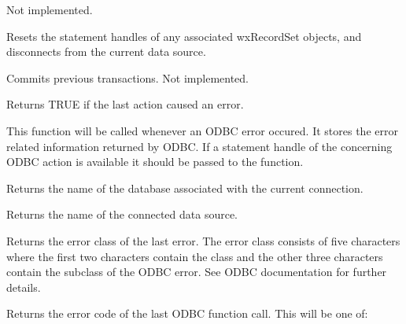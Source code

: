 
Not implemented.



Resets the statement handles of any associated wxRecordSet objects,
and disconnects from the current data source.



Commits previous transactions. Not implemented.



Returns TRUE if the last action caused an error.



This function will be called whenever an ODBC error occured. It stores the
error related information returned by ODBC. If a statement handle of the
concerning ODBC action is available it should be passed to the function.



Returns the name of the database associated with the current connection.



Returns the name of the connected data source.



Returns the error class of the last error. The error class consists of
five characters where the first two characters contain the class
and the other three characters contain the subclass of the ODBC error.
See ODBC documentation for further details.



Returns the error code of the last ODBC function call. This will be one of:

